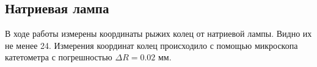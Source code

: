 \documentclass[a4paper,12pt]{article}
\theoremstyle{definition}
\begin{document}
\subsection{Натриевая лампа}
В ходе работы измерены координаты рыжих колец от натриевой лампы. Видно их не менее 24. Измерения координат колец происходило с помощью
микроскопа катетометра с погрешностью $\Delta {R} = 0.02$ мм.

\begin{figure}[H]
	\begin{minipage}[h]{0.5\linewidth}
	\end{minipage}
	\begin{minipage}[h]{0.47\linewidth}
	\end{minipage}
\end{figure}
\end{document}

